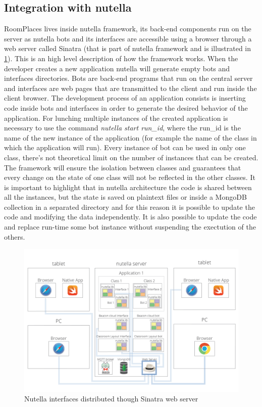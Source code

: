 \subsection{Integration with nutella}
RoomPlaces lives inside nutella framework, its back-end components run on the server as nutella bots and its interfaces are accessible using a browser through a web server called Sinatra (that is part of nutella framework and is illustrated in \ref{fig:nutella_web_server}). This is an high level description of how the framework works. When the developer creates a new application nutella will generate empty bots and interfaces directories. Bots are back-end programs that run on the central server and interfaces are web pages that are transmitted to the client and run inside the client browser. The development  process of an application consists is inserting code inside bots and interfaces in order to generate the desired behavior of the application. For lunching multiple instances of the created application is necessary to use the command \textit{nutella start run\_id}, where the run\_id is the name of the new instance of the application (for example the name of the class in which the application will run). Every instance of bot can be used in only one class, there's not theoretical limit on the number of instances that can be created. The framework will ensure the isolation between classes and guarantees that every change on the state of one class will not be reflected in the other classes. It is important to highlight that in nutella architecture the code is shared between all the instances, but the state is saved on plaintext files or inside a MongoDB collection in a separated directory and for this reason it is possible to update the code and modifying the data independently. It is also possible to update the code and replace run-time some bot instance without suspending the exectution of the others.

\begin{figure}
\centering
\includegraphics[width=6in]{images/nutella-client-server-webserver.png}
\caption{Nutella interfaces distributed though Sinatra web server}
\label{fig:nutella_web_server}
\end{figure}

